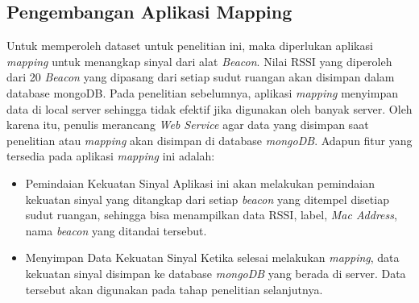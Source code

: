 \subsection{Pengembangan Aplikasi Mapping}
\par Untuk memperoleh dataset untuk penelitian ini, maka diperlukan aplikasi \textit{mapping} untuk menangkap sinyal  dari alat \textit{Beacon}. Nilai RSSI yang diperoleh dari 20 \textit{Beacon} yang dipasang dari setiap sudut ruangan akan disimpan dalam database mongoDB. Pada penelitian sebelumnya, aplikasi \textit{mapping} menyimpan data di local server sehingga  tidak efektif jika digunakan oleh banyak server. Oleh karena itu, penulis merancang \textit{Web Service} agar data yang disimpan saat penelitian atau \textit{mapping} akan disimpan di database \textit{mongoDB}. Adapun fitur yang tersedia pada aplikasi \textit{mapping} ini adalah:

\begin {itemize}
\itemsep0em
\item Pemindaian Kekuatan Sinyal \newline
Aplikasi ini akan melakukan pemindaian kekuatan sinyal yang ditangkap dari setiap \textit{beacon} yang ditempel disetiap sudut ruangan, sehingga bisa menampilkan data RSSI, label, \textit{Mac Address}, nama \textit{beacon} yang ditandai tersebut.

\item Menyimpan Data Kekuatan Sinyal \newline
Ketika selesai melakukan \textit{mapping}, data kekuatan sinyal disimpan ke database \textit{mongoDB} yang berada di server. Data tersebut akan digunakan pada tahap penelitian selanjutnya.

\end{itemize}

